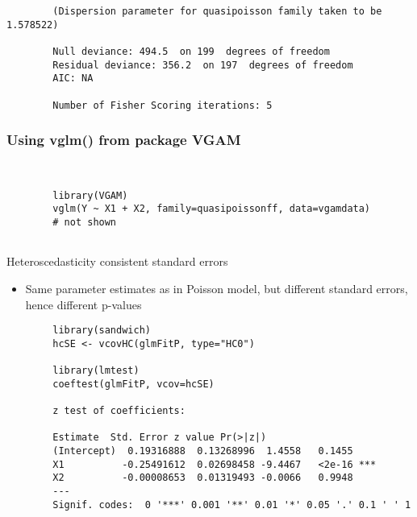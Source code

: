\documentclass{beamer}
\begin{document}
	\begin{frame}[fragile]
		\begin{verbatim}
		(Dispersion parameter for quasipoisson family taken to be 1.578522)
		
		Null deviance: 494.5  on 199  degrees of freedom
		Residual deviance: 356.2  on 197  degrees of freedom
		AIC: NA
		
		Number of Fisher Scoring iterations: 5
		\end{verbatim}
	\end{frame}
	\begin{frame}[fragile]
	\frametitle{Using vglm() from package VGAM}
	\begin{verbatim}
		
		
		library(VGAM)
		vglm(Y ~ X1 + X2, family=quasipoissonff, data=vgamdata)
		# not shown
		
		\end{verbatim}
		
		
	\end{frame}
	\begin{frame}[fragile]
	Heteroscedasticity consistent standard errors
	\begin{itemize}
	\item Same parameter estimates as in Poisson model, but different standard errors, hence different p-values
	\end{itemize}
	
	\end{frame}
	\begin{frame}[fragile]
		\begin{verbatim}
		library(sandwich)
		hcSE <- vcovHC(glmFitP, type="HC0")
		
		library(lmtest)
		coeftest(glmFitP, vcov=hcSE)
		
		z test of coefficients:
		
		Estimate  Std. Error z value Pr(>|z|)    
		(Intercept)  0.19316888  0.13268996  1.4558   0.1455    
		X1          -0.25491612  0.02698458 -9.4467   <2e-16 ***
		X2          -0.00008653  0.01319493 -0.0066   0.9948    
		---
		Signif. codes:  0 '***' 0.001 '**' 0.01 '*' 0.05 '.' 0.1 ' ' 1
		\end{verbatim}
	\end{frame}
\end{document}
